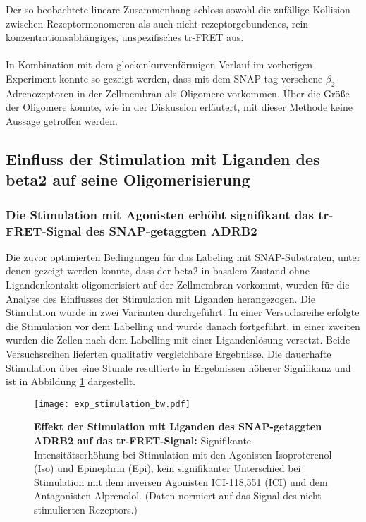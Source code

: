 Der so beobachtete lineare Zusammenhang schloss sowohl die zufällige Kollision zwischen Rezeptormonomeren als auch nicht-rezeptorgebundenes, rein konzentrationsabhängiges, unspezifisches tr-FRET aus.
\\ \\
In Kombination mit dem glockenkurvenförmigen Verlauf im vorherigen Experiment konnte so gezeigt werden, dass mit dem SNAP-tag versehene $\beta_2$-Adrenozeptoren in der Zellmembran als Oligomere vorkommen. Über die Größe der Oligomere konnte, wie in der Diskussion erläutert, mit dieser Methode keine Aussage getroffen werden. 

\subsection{Einfluss der Stimulation mit Liganden des \gls{beta2} auf seine Oligomerisierung}
\label{res:stimulation}

\subsubsection{Die Stimulation mit Agonisten erhöht signifikant das tr-FRET-Signal des SNAP-getaggten ADRB2}

Die zuvor optimierten Bedingungen für das Labeling mit SNAP-Substraten, unter denen gezeigt werden konnte, dass der \gls{beta2} in basalem Zustand ohne Ligandenkontakt oligomerisiert auf der Zellmembran vorkommt, wurden für die Analyse des Einflusses der Stimulation mit Liganden herangezogen. Die Stimulation wurde in zwei Varianten durchgeführt: In einer Versuchsreihe erfolgte die Stimulation vor dem Labelling und wurde danach fortgeführt, in einer zweiten wurden die Zellen nach dem Labelling mit einer Ligandenlösung versetzt. Beide Versuchsreihen lieferten qualitativ vergleichbare Ergebnisse. Die dauerhafte Stimulation über eine Stunde resultierte in Ergebnissen höherer Signifikanz und ist in Abbildung \ref{fig:stimulation} dargestellt.

\begin{figure}[htbp]
	\centering
    \texttt{[image: exp\_stimulation\_bw.pdf]}
    \caption{\textbf{Effekt der Stimulation mit Liganden des SNAP-getaggten ADRB2 auf das tr-FRET-Signal:} Signifikante Intensitätserhöhung bei Stimulation mit den Agonisten Isoproterenol (Iso) und Epinephrin (Epi), kein signifikanter Unterschied bei Stimulation mit dem inversen Agonisten ICI-118,551 (ICI) und dem Antagonisten Alprenolol. (Daten normiert auf das Signal des nicht stimulierten Rezeptors.)} 
    \label{fig:stimulation}
\end{figure}

